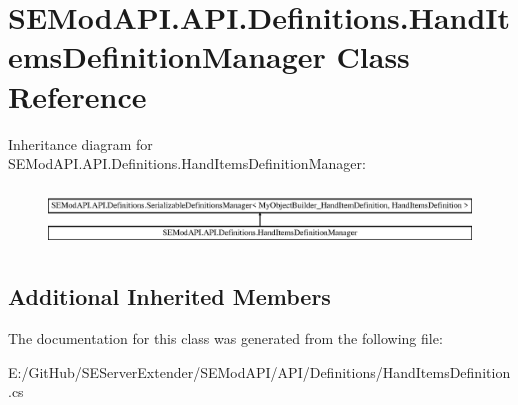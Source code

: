 \hypertarget{class_s_e_mod_a_p_i_1_1_a_p_i_1_1_definitions_1_1_hand_items_definition_manager}{}\section{S\+E\+Mod\+A\+P\+I.\+A\+P\+I.\+Definitions.\+Hand\+Items\+Definition\+Manager Class Reference}
\label{class_s_e_mod_a_p_i_1_1_a_p_i_1_1_definitions_1_1_hand_items_definition_manager}
Inheritance diagram for S\+E\+Mod\+A\+P\+I.\+A\+P\+I.\+Definitions.\+Hand\+Items\+Definition\+Manager\+:\begin{figure}[H]
\begin{center}
\leavevmode
\includegraphics[height=1.602289cm]{class_s_e_mod_a_p_i_1_1_a_p_i_1_1_definitions_1_1_hand_items_definition_manager}
\end{center}
\end{figure}
\subsection*{Additional Inherited Members}


The documentation for this class was generated from the following file\+:\begin{DoxyCompactItemize}
\item 
E\+:/\+Git\+Hub/\+S\+E\+Server\+Extender/\+S\+E\+Mod\+A\+P\+I/\+A\+P\+I/\+Definitions/Hand\+Items\+Definition.\+cs\end{DoxyCompactItemize}

